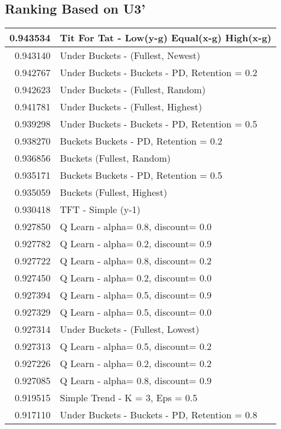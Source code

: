 \begin{table}[!hbtp]
\subsection{Ranking Based on U3'}
\begin{footnotesize}
\begin{tabular}{|r|l|}\hline  \label{U3results}
0.943534 & Tit For Tat - Low(y-g) Equal(x-g) High(x-g)\\ \hline
0.943140 & Under Buckets - (Fullest, Newest)\\ \hline
0.942767 & Under Buckets - Buckets - PD, Retention = 0.2\\ \hline
0.942623 & Under Buckets - (Fullest, Random)\\ \hline
0.941781 & Under Buckets - (Fullest, Highest)\\ \hline
0.939298 & Under Buckets - Buckets - PD, Retention = 0.5\\ \hline
0.938270 & Buckets Buckets - PD, Retention = 0.2\\ \hline
0.936856 & Buckets (Fullest, Random)\\ \hline
0.935171 & Buckets Buckets - PD, Retention = 0.5\\ \hline
0.935059 & Buckets (Fullest, Highest)\\ \hline
0.930418 & TFT - Simple (y-1)\\ \hline
0.927850 & Q Learn - alpha= 0.8, discount= 0.0\\ \hline
0.927782 & Q Learn - alpha= 0.2, discount= 0.9\\ \hline
0.927722 & Q Learn - alpha= 0.8, discount= 0.2\\ \hline
0.927450 & Q Learn - alpha= 0.2, discount= 0.0\\ \hline
0.927394 & Q Learn - alpha= 0.5, discount= 0.9\\ \hline
0.927329 & Q Learn - alpha= 0.5, discount= 0.0\\ \hline
0.927314 & Under Buckets - (Fullest, Lowest)\\ \hline
0.927313 & Q Learn - alpha= 0.5, discount= 0.2\\ \hline
0.927226 & Q Learn - alpha= 0.2, discount= 0.2\\ \hline
0.927085 & Q Learn - alpha= 0.8, discount= 0.9\\ \hline
0.919515 & Simple Trend - K = 3, Eps = 0.5\\ \hline
0.917110 & Under Buckets - Buckets - PD, Retention = 0.8\\ \hline

\end{tabular}
\end{footnotesize}
\end{table}
